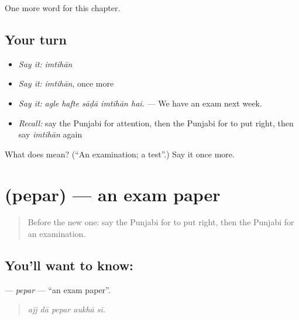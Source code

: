 \begin{grammarlens}[title={What you've built}]
One more word for this chapter.
\end{grammarlens}

\subsection*{Your turn}
\begin{itemize}
\raggedright
  \item \emph{Say it:} \emph{imtihān}
  \item \emph{Say it:} \emph{imtihān}, once more
  \item \emph{Say it:} \emph{agle hafte sāḍā imtihān hai.} — We have an exam next week.
  \item \emph{Recall:} say the Punjabi for attention, then the Punjabi for to put right, then say \emph{imtihān} again
\end{itemize}

\begin{tcolorbox}[breakable,colback=teal!4,colframe=teal!35!black,title={Before you move on}]
What does  mean? (\textquotedblleft{}An examination; a test\textquotedblright{}.) Say it once more.
\end{tcolorbox}
\section[\texorpdfstring{\pa{ਪੇਪਰ} (pepar)}{ਪੇਪਰ (pepar)}]{ (pepar) — an exam paper}

\label{lesson:PA-C360-pepar}



\begin{quote}
Before the new one: say the Punjabi for to put right, then the Punjabi for an examination.
\end{quote}

\subsection*{You'll want to know: }
\textbf{} — \emph{pepar} — \textquotedblleft{}an exam paper\textquotedblright{}.

\begin{quote}
    
\end{quote}

\begin{quote}
\emph{ajj dā pepar aukhā sī.}
\end{quote}


